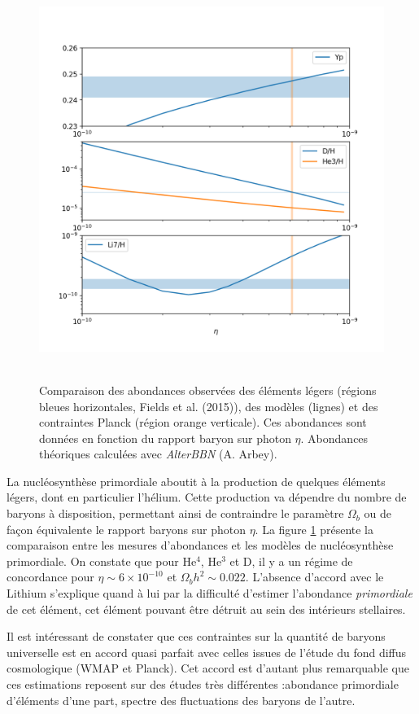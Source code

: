 \begin{figure}[htbp]
	\centering
		\includegraphics[height=13cm]{figs/BBN.png}
		\caption{Comparaison des abondances observées des éléments légers (régions bleues horizontales, Fields et al. (2015)), des modèles (lignes) et des contraintes Planck (région orange verticale). Ces abondances sont données en fonction du rapport baryon sur photon  $\eta$. Abondances théoriques calculées avec \textit{AlterBBN} (A. Arbey).}
	\label{f:nucle}
\end{figure}

La nucléosynthèse primordiale aboutit à la production de quelques éléments légers, dont en particulier l'hélium. Cette production va dépendre du nombre de baryons à disposition, permettant ainsi de contraindre le paramètre $\Omega_b$ ou de façon équivalente le rapport baryons sur photon $\eta$. La figure \ref{f:nucle} présente la comparaison entre les mesures d'abondances et les modèles de nucléosynthèse primordiale. On constate que pour He$^4$, He$^3$ et D, il y a un régime de concordance pour $\eta \sim 6\times 10^{-10}$ et $\Omega_b h^2\sim 0.022$. L'absence d'accord avec le Lithium s'explique quand à lui par la difficulté d'estimer l'abondance \textit{primordiale} de cet élément, cet élément pouvant être détruit au sein des intérieurs stellaires.

Il est intéressant de constater que ces contraintes sur la quantité de baryons universelle est en accord quasi parfait avec celles issues de l'étude du fond diffus cosmologique (WMAP et Planck). Cet accord est d'autant plus remarquable que ces estimations reposent sur des études très différentes :abondance primordiale d'éléments d'une part, spectre des fluctuations des baryons de l'autre.

